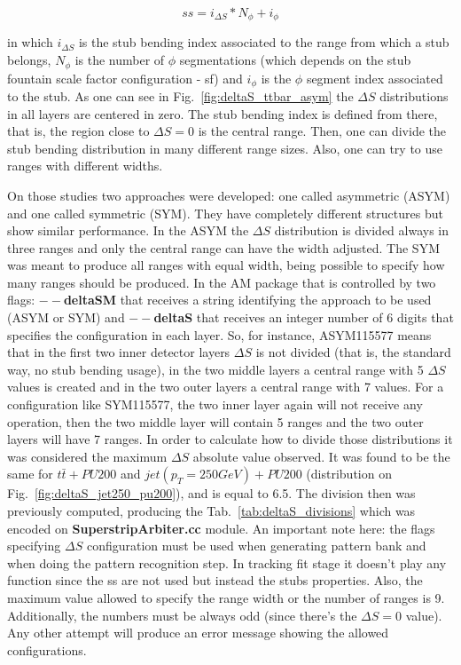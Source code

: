 \begin{equation}
ss = i_{\Delta S}*N_{\phi} + i_{\phi}
\end{equation}

in which $i_{\Delta S}$ is the stub bending index associated to the range from which a stub belongs, $N_{\phi}$ is the number of $\phi$ segmentations (which depends on the stub fountain scale factor configuration - sf) and $i_{\phi}$ is the $\phi$ segment index associated to the stub. As one can see in Fig.~\ref{fig:deltaS_ttbar_asym} the $\Delta S$ distributions in all layers are centered in zero. The stub bending index is defined from there, that is, the region close to $\Delta S = 0$ is the central range. Then, one can divide the stub bending distribution in many different range sizes. Also, one can try to use ranges with different widths. 

On those studies two approaches were developed: one called asymmetric (ASYM) and one called symmetric (SYM). They have completely different structures but show similar performance. In the ASYM the $\Delta S$ distribution is divided always in three ranges and only the central range can have the width adjusted. The SYM was meant to produce all ranges with equal width, being possible to specify how many ranges should be produced. In the AM package that is controlled by two flags: \textbf{$--$deltaSM} that receives a string identifying the approach to be used (ASYM or SYM) and \textbf{$--$deltaS} that receives an integer number of 6 digits that specifies the configuration in each layer. So, for instance, ASYM115577 means that in the first two inner detector layers $\Delta S$ is not divided (that is, the standard way, no stub bending usage), in the two middle layers a central range with 5 $\Delta S$ values is created and in the two outer layers a central range with 7 values. For a configuration like SYM115577, the two inner layer again will not receive any operation, then the two middle layer will contain 5 ranges and the two outer layers will have 7 ranges. In order to calculate how to divide those distributions it was considered the maximum $\Delta S$ absolute value observed. It was found to be the same for $t\bar{t}+PU200$ and $jet(p_{T}=250GeV)+PU200$ (distribution on Fig.~\ref{fig:deltaS_jet250_pu200}), and is equal to 6.5. The division then was previously computed, producing the Tab.~\ref{tab:deltaS_divisions} which was encoded on \textbf{SuperstripArbiter.cc} module. An important note here: the flags specifying $\Delta S$ configuration must be used when generating pattern bank and when doing the pattern recognition step. In tracking fit stage it doesn't play any function since the ss are not used but instead the stubs properties. Also, the maximum value allowed to specify the range width or the number of ranges is 9. Additionally, the numbers must be always odd (since there's the $\Delta S = 0$ value). Any other attempt will produce an error message showing the allowed configurations.

